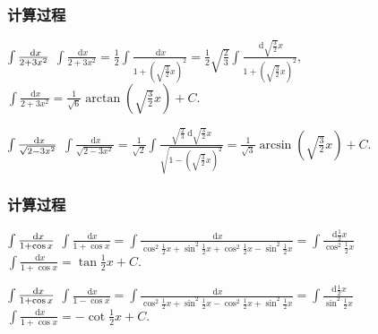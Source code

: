 \documentclass[
10pt,
aspectratio=43,
]{beamer}
\begin{document}
\begin{frame}
	\frametitle{计算过程}
	\everymath{\displaystyle}
	\begin{exampleblock}{$\color{black}\int \frac{\mathrm{~d} x}{2+3 x^2}$}
		$
			\int \frac{\mathrm{~d} x}{2+3 x^2}=\frac{1}{2}\int \frac{\mathrm{~d} x}{1+ \left(\sqrt{\frac{3}{2}}x\right)^2}=\frac{1}{2}\sqrt{\frac{2}{3}}\int \frac{\mathrm{~d}\sqrt{\frac{3}{2}} x}{1+ \left(\sqrt{\frac{3}{2}}x\right)^2},
		$\\
		$
			\int \frac{\mathrm{~d} x}{2+3 x^2}=\frac{1}{\sqrt{6}}\arctan\left(\sqrt{\frac{3}{2}}x\right)+C.
		$
	\end{exampleblock}
	\pause
	\begin{exampleblock}{$\color{black}\int \frac{\mathrm{~d} x}{\sqrt{2-3 x^2}}$}
		$
			\int \frac{\mathrm{~d} x}{\sqrt{2-3 x^2}}=\frac{1}{\sqrt{2}}\int \frac{\sqrt{\frac{2}{3}}\mathrm{~d}\sqrt{\frac{3}{2}}x}{\sqrt{1-\left(\sqrt{\frac{3}{2}}x\right)^2}}=\frac{1}{\sqrt{3}} \arcsin \left(\sqrt{\frac{3}{2}} x\right)+C.
		$
	\end{exampleblock}
\end{frame}

\begin{frame}
	\frametitle{计算过程}
	\everymath{\displaystyle}
	\begin{exampleblock}{$\color{black}\int \frac{\mathrm{~d} x}{1+\cos x}$}
		$
			\int \frac{\mathrm{~d} x}{1+\cos x}=\int \frac{\mathrm{~d} x}{\cos^2\frac{1}{2}x + \sin^2\frac{1}{2}x+ \cos^2\frac{1}{2}x - \sin^2\frac{1}{2}x}=\int \frac{\mathrm{~d}\frac{1}{2}x}{\cos^2\frac{1}{2}x}
		$\\
		$
			\int \frac{\mathrm{~d} x}{1+\cos x}=\tan\frac{1}{2}x+C.
		$
	\end{exampleblock}
	\pause
	\begin{exampleblock}{$\color{black}\int \frac{\mathrm{~d} x}{1+\cos x}$}
		$
			\int \frac{\mathrm{~d} x}{1-\cos x}=\int \frac{\mathrm{~d} x}{\cos^2\frac{1}{2}x + \sin^2\frac{1}{2}x- \cos^2\frac{1}{2}x + \sin^2\frac{1}{2}x}=\int \frac{\mathrm{~d}\frac{1}{2}x}{\sin^2\frac{1}{2}x}
		$\\
		$
			\int \frac{\mathrm{~d} x}{1+\cos x}=-\cot\frac{1}{2}x+C.
		$
	\end{exampleblock}
\end{frame}
\end{document}

